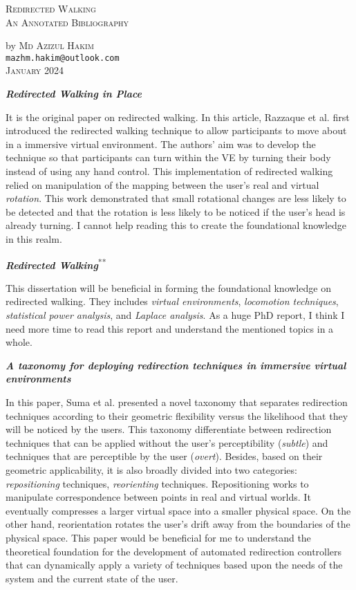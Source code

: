 \documentclass[12pt]{article}
\makeatletter
\newcommand\topPageBottom{
\noindent \hrulefill by {\scshape Md Azizul Hakim}\noindent \hrulefill \\
\normalsize
\texttt{mazhm.hakim@outlook.com} \\
\vspace{2.0em}
{\scshape January 2024}
}
\makeatother
\begin{document}
\begin{center}
\Huge
{\scshape Redirected Walking} \\
\LARGE
{\scshape An Annotated Bibliography} \\
\large
\topPageBottom
\end{center}

\vspace{2.0em}

\noindent
\textbf{\cite{razzaque2002redirected} \emph{Redirected Walking in Place}}

It is the original paper on redirected walking. In this article, Razzaque et al. first introduced the redirected walking technique to allow participants to move about in a immersive virtual environment. The authors' aim was to develop the technique so that participants can turn within the VE by turning their body instead of using any hand control. This implementation of redirected walking relied on manipulation of the mapping between the user's real and virtual \emph{rotation}. This work demonstrated that small rotational changes are less likely to be detected and that the rotation is less likely to be noticed if the user's head is already turning. I cannot help reading this to create the foundational knowledge in this realm.


\noindent
\textbf{\cite{razzaque2005redirected} \emph{Redirected Walking}}\textsuperscript{**}

This dissertation will be beneficial in forming the foundational knowledge on redirected walking. They includes \emph{virtual environments}, \emph{locomotion techniques}, \emph{statistical power analysis}, and \emph{Laplace analysis}. As a huge PhD report, I think I need more time to read this report and understand the mentioned topics in a whole.

\noindent
\textbf{\cite{suma2012taxonomy} \emph{A taxonomy for deploying redirection techniques in immersive virtual environments}}

In this paper, Suma et al. presented a novel taxonomy that separates redirection techniques according to their geometric flexibility versus the likelihood that they will be noticed by the users. This taxonomy differentiate between redirection techniques that can be applied without the user's perceptibility (\emph{subtle}) and techniques that are perceptible by the user (\emph{overt}). Besides, based on their geometric applicability, it is also broadly divided into two categories: \emph{repositioning} techniques, \emph{reorienting} techniques. Repositioning works to manipulate correspondence between points in real and virtual worlds. It eventually compresses a larger virtual space into a smaller physical space. On the other hand, reorientation rotates the user's drift away from the boundaries of the physical space. This paper would be beneficial for me to understand the theoretical foundation for the development of automated redirection controllers that can dynamically apply a variety of techniques based upon the needs of the system and the current state of the user.
\end{document}
